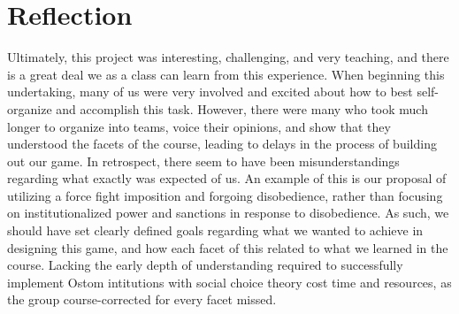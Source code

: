 \chapter{Reflection}\label{sec:reflection}

Ultimately, this project was interesting, challenging, and very teaching, and there is a great deal we as a class can learn from this experience. When beginning this undertaking, many of us were very involved and excited about how to best self-organize and accomplish this task. However, there were many who took much longer to organize into teams, voice their opinions, and show that they understood the facets of the course, leading to delays in the process of building out our game. In retrospect, there seem to have been misunderstandings regarding what exactly was expected of us. An example of this is our proposal of utilizing a force fight imposition and forgoing disobedience, rather than focusing on institutionalized power and sanctions in response to disobedience. As such, we should have set clearly defined goals regarding what we wanted to achieve in designing this game, and how each facet of this related to what we learned in the course. Lacking the early depth of understanding required to successfully implement Ostom intitutions with social choice theory cost time and resources, as the group course-corrected for every facet missed. 

